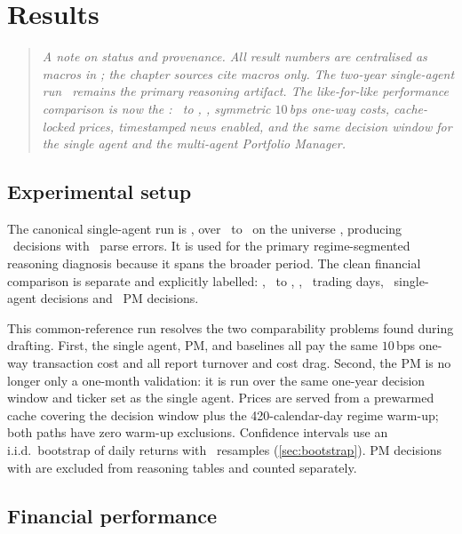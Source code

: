 \chapter{Results}
\label{ch:results}

\begin{quote}\small\itshape
A note on status and provenance. All result numbers are centralised as macros in
; the chapter sources cite macros only. The two-year single-agent
run \runId\ remains the primary reasoning artifact. The like-for-like performance comparison
is now the \commonRunLabel: \commonStart\ to \commonEnd, \commonUniverse, symmetric
$10$\,bps one-way costs, cache-locked prices, timestamped news enabled, and the same decision
window for the single agent and the multi-agent Portfolio Manager.
\end{quote}

\section{Experimental setup}
\label{sec:setup}

The canonical single-agent run is \runId, over \studyStart\ to \studyEnd\ on the universe
\universeList, producing \nDecisions\ decisions with \nParseErrors\ parse errors. It is used
for the primary regime-segmented reasoning diagnosis because it spans the broader period. The
clean financial comparison is separate and explicitly labelled: \commonRunLabel,
\commonStart\ to \commonEnd, \commonUniverse, \commonNTradingDays\ trading days,
\commonSingleDecisions\ single-agent decisions and \commonPmDecisions\ PM decisions.

This common-reference run resolves the two comparability problems found during drafting. First,
the single agent, PM, and baselines all pay the same $10$\,bps one-way transaction cost and all
report turnover and cost drag. Second, the PM is no longer only a one-month validation: it is
run over the same one-year decision window and ticker set as the single agent. Prices are served
from a prewarmed cache covering the decision window plus the 420-calendar-day regime warm-up;
both paths have zero warm-up exclusions. Confidence intervals use an i.i.d.\ bootstrap of daily
returns with \bootstrapResamples\ resamples (\cref{sec:bootstrap}). PM decisions with
 are excluded from reasoning tables and counted separately.

\section{Financial performance}
\label{sec:resultsfin}

